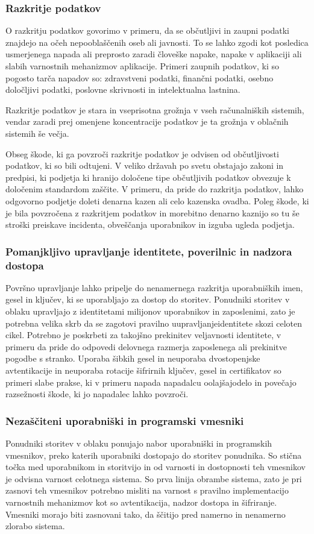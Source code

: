 \documentclass[12pt,a4paper,openany]{book}
\begin{document}
\subsubsection{Razkritje podatkov}
O razkritju podatkov govorimo v primeru, da se občutljivi in zaupni podatki znajdejo na očeh nepooblaščenih oseb ali javnosti.  To se lahko zgodi kot posledica usmerjenega napada ali preprosto zaradi človeške napake, napake v aplikaciji ali slabih varnostnih mehanizmov aplikacije. Primeri zaupnih podatkov, ki so pogosto tarča napadov so: zdravstveni podatki, finančni podatki, osebno določljivi podatki, poslovne skrivnosti in intelektualna lastnina.

Razkritje podatkov je stara in vseprisotna grožnja v vseh računalniških sistemih, vendar zaradi prej omenjene koncentracije podatkov je ta grožnja v oblačnih sistemih še večja.

Obseg škode, ki ga povzroči razkritje podatkov je odvisen od občutljivosti podatkov, ki so bili odtujeni. V veliko državah po svetu obstajajo zakoni in predpisi, ki podjetja ki hranijo določene tipe občutljivih podatkov obvezuje k določenim standardom zaščite. V primeru, da pride do razkritja podatkov, lahko odgovorno podjetje doleti denarna kazen ali celo kazenska ovadba. Poleg škode, ki je bila povzročena z razkritjem podatkov in morebitno denarno kaznijo so tu še stroški preiskave incidenta, obveščanja uporabnikov in izguba ugleda podjetja.

\subsubsection{Pomanjkljivo upravljanje identitete, poverilnic in nadzora dostopa}
Površno upravljanje lahko pripelje do nenamernega razkritja uporabniških imen, gesel in ključev, ki se uporabljajo za dostop do storitev. Ponudniki storitev v oblaku upravljajo z identitetami milijonov uporabnikov in zaposlenimi, zato je potrebna velika skrb da se zagotovi pravilno uupravljanjeidentitete skozi celoten cikel. Potrebno je poskrbeti za takojšno prekinitev veljavnosti identitete, v primeru da pride do odpovedi delovnega razmerja zaposlenega ali prekinitve pogodbe s stranko. Uporaba šibkih gesel in neuporaba dvostopenjske avtentikacije in neuporaba rotacije šifrirnih ključev, gesel in certifikatov so primeri slabe prakse, ki v primeru napada napadalcu oolajšajodelo in povečajo razsežnosti škode, ki jo napadalec lahko povzroči.

\subsubsection{Nezaščiteni uporabniški in programski vmesniki}
Ponudniki storitev v oblaku ponujajo nabor uporabniški in programskih vmesnikov, preko katerih uporabniki dostopajo do storitev ponudnika. So stična točka med uporabnikom in storitvijo in od varnosti in dostopnosti teh vmesnikov je odvisna varnost celotnega sistema. So prva linija obrambe sistema, zato je pri zasnovi teh vmesnikov potrebno misliti na varnost s pravilno implementacijo varnostnih mehanizmov kot so avtentikacija, nadzor dostopa in šifriranje. Vmesniki morajo biti zasnovani tako, da ščitijo pred namerno in nenamerno zlorabo sistema.
\end{document}
